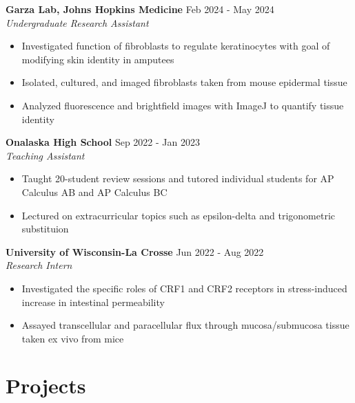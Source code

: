 \documentclass[11pt]{article}       %
\begin{document}
\textbf{Garza Lab, Johns Hopkins Medicine} \hfill Feb 2024 - May 2024 \\
\textit{Undergraduate Research Assistant} \vspace{-9pt} \\
\begin{itemize}
  \item Investigated function of fibroblasts to regulate keratinocytes with goal of modifying skin identity in amputees
  \item Isolated, cultured, and imaged fibroblasts taken from mouse epidermal tissue
  \item Analyzed fluorescence and brightfield images with ImageJ to quantify tissue identity
\end{itemize}

\textbf{Onalaska High School} \hfill Sep 2022 - Jan 2023 \\
\textit{Teaching Assistant} \vspace{-9pt} \\
\begin{itemize}
  \item Taught 20-student review sessions and tutored individual students for AP Calculus AB and AP Calculus BC
  \item Lectured on extracurricular topics such as epsilon-delta and trigonometric substituion
\end{itemize}

\textbf{University of Wisconsin-La Crosse} \hfill Jun 2022 - Aug 2022 \\
\textit{Research Intern} \vspace{-9pt} \\
\begin{itemize}
  \item Investigated the specific roles of CRF1 and CRF2 receptors in stress-induced increase in intestinal permeability
  \item Assayed transcellular and paracellular flux through mucosa/submucosa tissue taken ex vivo from mice
\end{itemize}

\vspace{-18.5pt}

\section*{Projects}
\end{document}
